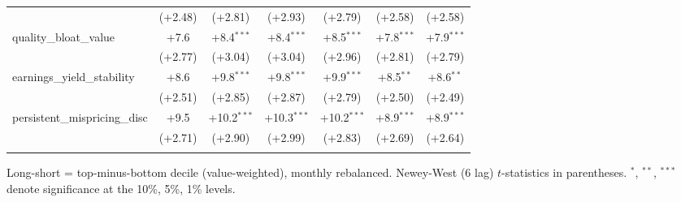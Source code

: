\begin{table}[htbp]
\begin{threeparttable}
\begin{tabular}{lcccccc}
 & (+2.48) & (+2.81) & (+2.93) & (+2.79) & (+2.58) & (+2.58) \\
\addlinespace
quality\_bloat\_value & +7.6 & +8.4$^{***}$ & +8.4$^{***}$ & +8.5$^{***}$ & +7.8$^{***}$ & +7.9$^{***}$ \\
 & (+2.77) & (+3.04) & (+3.04) & (+2.96) & (+2.81) & (+2.79) \\
\addlinespace
earnings\_yield\_stability & +8.6 & +9.8$^{***}$ & +9.8$^{***}$ & +9.9$^{***}$ & +8.5$^{**}$ & +8.6$^{**}$ \\
 & (+2.51) & (+2.85) & (+2.87) & (+2.79) & (+2.50) & (+2.49) \\
\addlinespace
persistent\_mispricing\_disc & +9.5 & +10.2$^{***}$ & +10.3$^{***}$ & +10.2$^{***}$ & +8.9$^{***}$ & +8.9$^{***}$ \\
 & (+2.71) & (+2.90) & (+2.99) & (+2.83) & (+2.69) & (+2.64) \\
\addlinespace
\bottomrule
\end{tabular}
\begin{tablenotes}\footnotesize
\item Long-short = top-minus-bottom decile (value-weighted), monthly rebalanced. Newey-West (6 lag) $t$-statistics in parentheses. $^{*}$, $^{**}$, $^{***}$ denote significance at the 10\%, 5\%, 1\% levels.
\end{tablenotes}
\end{threeparttable}
\end{table}